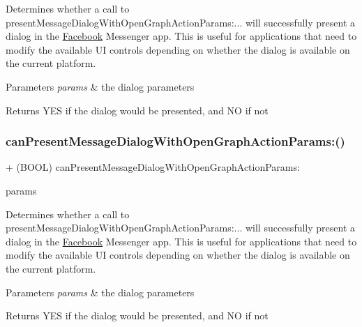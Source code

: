 Determines whether a call to {\ttfamily present\+Message\+Dialog\+With\+Open\+Graph\+Action\+Params\+:...} will successfully present a dialog in the \hyperlink{interfaceFacebook}{Facebook} Messenger app. This is useful for applications that need to modify the available UI controls depending on whether the dialog is available on the current platform.


\begin{DoxyParams}{Parameters}
{\em params} & the dialog parameters\\
\hline
\end{DoxyParams}
\begin{DoxyReturn}{Returns}
Y\+ES if the dialog would be presented, and NO if not 
\end{DoxyReturn}
\mbox{\label{interfaceFBDialogs_abc596dd117701ceb160dd63db514cf11}} 
\subsubsection{\texorpdfstring{can\+Present\+Message\+Dialog\+With\+Open\+Graph\+Action\+Params\+:()}{canPresentMessageDialogWithOpenGraphActionParams:()}\hspace{0.1cm}{\footnotesize\ttfamily [2/5]}}
{\footnotesize\ttfamily + (B\+O\+OL) can\+Present\+Message\+Dialog\+With\+Open\+Graph\+Action\+Params\+: \begin{DoxyParamCaption}\item[{(\hyperlink{interfaceFBOpenGraphActionParams}{F\+B\+Open\+Graph\+Action\+Params} $\ast$)}]{params }\end{DoxyParamCaption}}

Determines whether a call to {\ttfamily present\+Message\+Dialog\+With\+Open\+Graph\+Action\+Params\+:...} will successfully present a dialog in the \hyperlink{interfaceFacebook}{Facebook} Messenger app. This is useful for applications that need to modify the available UI controls depending on whether the dialog is available on the current platform.


\begin{DoxyParams}{Parameters}
{\em params} & the dialog parameters\\
\hline
\end{DoxyParams}
\begin{DoxyReturn}{Returns}
Y\+ES if the dialog would be presented, and NO if not 
\end{DoxyReturn}
\mbox{\label{interfaceFBDialogs_abc596dd117701ceb160dd63db514cf11}} 

